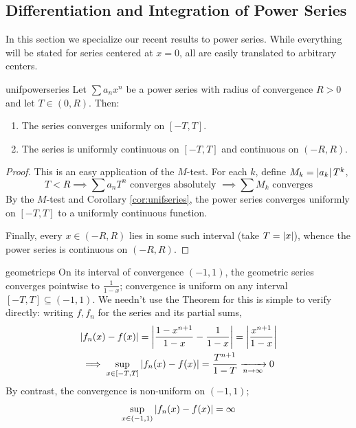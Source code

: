\goodbreak


\subsection{Differentiation and Integration of Power Series}\label{sec:diffintpower}

In this section we specialize our recent results to power series. While everything will be stated for series centered at $x=0$, all are easily translated to arbitrary centers.

\begin{thm}{}{unifpowerseries}
Let $\sum a_nx^n$ be a power series with radius of convergence $R>0$ and let $T\in(0,R)$. Then:
\begin{enumerate}
  \item The series converges uniformly on $[-T,T]$.
  \item The series is uniformly continuous on $[-T,T]$ and continuous on $(-R,R)$.
\end{enumerate} 
\end{thm}

\vfil

\begin{proof}
This is an easy application of the $M$-test. For each $k$, define $M_k=\left| a_k\right|T^k$,
\[T<R\implies \sum a_nT^n\text{ converges absolutely }\implies \sum M_k\text{ converges}\]
By the $M$-test and Corollary \ref{cor:unifseries}, the power series converges uniformly on $[-T,T]$ to a uniformly continuous function.\medbreak

Finally, every $x\in(-R,R)$ lies in some such interval (take $T=\left| x\right|$), whence the power series is continuous on $(-R,R)$.
\end{proof}


\begin{example}{}{geometricps}
On its interval of convergence $(-1,1)$, the geometric series  converges pointwise to $\frac 1{1-x}$; convergence is uniform on any interval $[-T,T]\subseteq(-1,1)$.\smallbreak
We needn't use the Theorem for this is simple to verify directly: writing $f,f_n$ for the series and its partial sums,
\begin{gather*}
\left| f_n(x)-f(x)\right|=\left| \frac{1-x^{n+1}}{1-x}-\frac 1{1-x}\right|=\left| \frac{x^{n+1}}{1-x}\right|\\
\implies \sup_{x\in [-T,T]}\left| f_n(x)-f(x)\right|=\frac{T^{n+1}}{1-T} \xrightarrow[n\to\infty]{} 0
\end{gather*}
\smallbreak
By contrast, the convergence is non-uniform on $(-1,1)$;
\[\sup_{x\in(-1,1)}\left| f_n(x)-f(x)\right|=\infty\]
\end{example}

